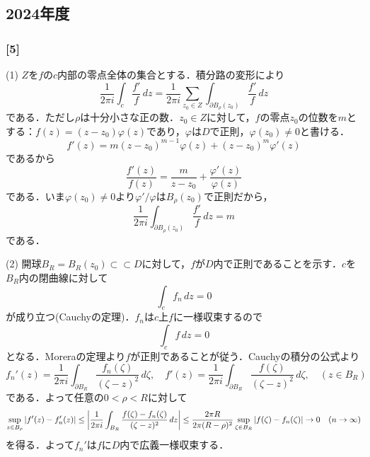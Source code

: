 \documentclass[a4j]{ltjsarticle}
\newcommand{\1}{\mathbbm{1}}
\numberwithin{equation}{section}
\theoremstyle{definition}
\begin{document}
\subsection{2024年度}
\subsubsection*{[5]}\label{pm_2024_5}
(1) $Z$を$f$の$c$内部の零点全体の集合とする．積分路の変形により
\begin{equation}
    \frac{1}{2\pi i}\int_{c}\frac{f'}{f}\,dz=\frac{1}{2\pi i}\sum_{z_0\in Z}\int_{\partial B_{\rho}(z_0)}\frac{f'}{f}\,dz 
\end{equation}
である．ただし$\rho$は十分小さな正の数．$z_0\in Z$に対して，$f$の零点$z_0$の位数を$m$とする：$f(z)=(z-z_0)\varphi(z)$であり，$\varphi$は$D$で正則，$\varphi(z_0)\neq0$と書ける．
\begin{equation}
    f'(z)=m(z-z_0)^{m-1}\varphi(z)+(z-z_0)^m\varphi'(z)
\end{equation}
であるから
\begin{equation}
    \frac{f'(z)}{f(z)}=\frac{m}{z-z_0}+\frac{\varphi'(z)}{\varphi(z)}
\end{equation}
である．いま$\varphi(z_0)\neq0$より$\varphi'/\varphi$は$B_{\rho}(z_0)$で正則だから，
\begin{equation}
    \frac{1}{2\pi i}\int_{\partial B_{\rho}(z_0)}\frac{f'}{f}\,dz=m 
\end{equation}
である．

(2) 開球$B_R=B_{R}(z_0)\subset\subset D$に対して，$f$が$D$内で正則であることを示す．$c$を$B_R$内の閉曲線に対して
\begin{equation}
    \int_{c}f_n\,dz=0 
\end{equation}
が成り立つ(Cauchyの定理)．$f_n$は$c$上$f$に一様収束するので
\begin{equation}
    \int_{c}f\,dz=0 
\end{equation}
となる．Moreraの定理より$f$が正則であることが従う．Cauchyの積分の公式より
\begin{equation}
    f_n'(z)=\frac{1}{2\pi i}\int_{\partial B_R}\frac{f_n(\zeta)}{(\zeta-z)^2}\,d\zeta,\quad f'(z)=\frac{1}{2\pi i}\int_{\partial B_R}\frac{f(\zeta)}{(\zeta-z)^2}\,d\zeta,\quad (z\in B_R)
\end{equation}
である．よって任意の$0<\rho<R$に対して
\begin{equation}
    \sup_{z\in B_\rho}\abs{f'(z)-f_n'(z)}\leq \abs{\frac{1}{2\pi i}\int_{B_R}\frac{f(\zeta)-f_n(\zeta)}{(\zeta-z)^2}\,dz}\leq \frac{2\pi R}{2\pi(R-\rho)^2}\sup_{\zeta\in B_R}\abs{f(\zeta)-f_n(\zeta)}\to 0 \quad (n\to\infty)
\end{equation}
を得る．よって$f_n'$は$f$に$D$内で広義一様収束する．
\end{document}
